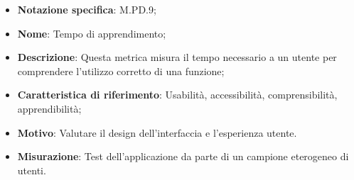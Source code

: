 \begin{itemize}
    \item \textbf{Notazione specifica}: M.PD.9;
    \item \textbf{Nome}: Tempo di apprendimento;
    \item \textbf{Descrizione}: Questa metrica misura il tempo necessario a un utente per comprendere l'utilizzo corretto di una funzione;
    \item \textbf{Caratteristica di riferimento}: Usabilità, accessibilità, comprensibilità, apprendibilità;
    \item \textbf{Motivo}: Valutare il design dell'interfaccia e l'esperienza utente.
    \item \textbf{Misurazione}: Test dell'applicazione da parte di un campione eterogeneo di utenti.
\end{itemize}